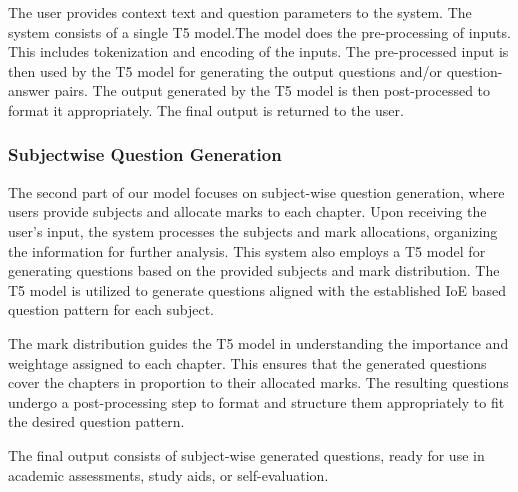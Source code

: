 \documentclass[12pt]{report}
\begin{document}
The user provides context text and question parameters to the system. The system consists of a single T5 model.The model does the pre-processing of inputs. This includes tokenization and encoding of the inputs. The pre-processed input is then used by the T5 model for generating the output questions and/or question-answer pairs. The output generated by the T5 model is then post-processed to format it appropriately.  The final output is returned to the user.
\subsubsection*{Subjectwise Question Generation}
The second part of our model focuses on subject-wise question generation, where users provide subjects and allocate marks to each chapter. Upon receiving the user's input, the system processes the subjects and mark allocations, organizing the information for further analysis. This system also employs a T5 model for generating questions based on the provided subjects and mark distribution. The T5 model is utilized to generate questions aligned with the established  IoE based question pattern for each subject.

The mark distribution guides the T5 model in understanding the importance and weightage assigned to each chapter. This ensures that the generated questions cover the chapters in proportion to their allocated marks. The resulting questions undergo a post-processing step to format and structure them appropriately to fit the desired question pattern.

The final output consists of subject-wise generated questions, ready for use in academic assessments, study aids, or self-evaluation. 
\end{document}
